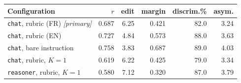 \setlength{\tabcolsep}{4pt}
\begin{tabular}{lrrrrr}
\toprule
Configuration & $r$ & edit & margin & discrim.\% & asym. \\
\midrule
\texttt{chat}, rubric (FR) \emph{[primary]} & 0.687 & 6.25 & 0.421 & 82.0 & 3.24 \\
\texttt{chat}, rubric (EN) & 0.727 & 4.84 & 0.573 & 88.0 & 3.63 \\
\texttt{chat}, bare instruction & 0.758 & 3.83 & 0.687 & 89.0 & 4.03 \\
\texttt{chat}, rubric, $K{=}1$ & 0.619 & 6.22 & 0.425 & 79.0 & 3.34 \\
\texttt{reasoner}, rubric, $K{=}1$ & 0.580 & 7.12 & 0.320 & 87.0 & 3.79 \\
\bottomrule
\end{tabular}